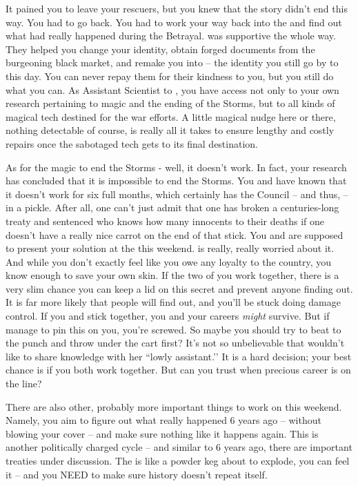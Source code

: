 \documentclass[char]{GL2020}
\begin{document}
It pained you to leave your rescuers, but you knew that the story didn’t end this way. You had to go back. You had to work your way back into the \pTech{} and find out what had really happened during the Betrayal. \cSavFlet{} was supportive the whole way. They helped you change your identity, obtain forged documents from the burgeoning black market, and remake you into \cAssistantScientist{} -- the identity you still go by to this day. You can never repay them for their kindness to you, but you still do what you can. As Assistant Scientist to \cHeadScientist{}, you have access not only to your own research pertaining to magic and the ending of the Storms, but to all kinds of magical tech destined for the war efforts. A little magical nudge here or there, nothing detectable of course, is really all it takes to ensure lengthy and costly repairs once the sabotaged tech gets to its final destination.

As for the magic to end the Storms - well, it doesn’t work. In fact, your research has concluded that it is impossible to end the Storms. You and \cHeadScientist{} have known that it doesn’t work for six full months, which certainly has the Council -- and thus, \cHeadScientist{} -- in a pickle.  After all, one can’t just admit that one has broken a centuries-long treaty and sentenced who knows how many innocents to their deaths if one doesn’t have a really nice carrot on the end of that stick. You and \cHeadScientist{} are supposed to present your solution at the \pSc{} this weekend. \cHeadScientist{} is really, really worried about it. And while you don’t exactly feel like you owe any loyalty to the country, you know enough to save your own skin. If the two of you work together, there is a very slim chance you can keep a lid on this secret and prevent anyone finding out. It is far more likely that people will find out, and you’ll be stuck doing damage control. If you and \cHeadScientist{} stick together, you and your careers \emph{might} survive. But if \cHeadScientist{\they} manage to pin this on you, you’re screwed. So maybe you should try to beat \cHeadScientist{\them} to the punch and throw \cHeadScientist{\them} under the cart first? It’s not so unbelievable that  \cHeadScientist{} wouldn’t like to share knowledge with her ``lowly assistant.’’ It is a hard decision; your best chance is if you both work together. But can you trust \cHeadScientist{} when \cHeadScientist{\their} precious career is on the line?

There are also other, probably more important things to work on this weekend. Namely, you aim to figure out what really happened 6 years ago -- without blowing your cover -- and make sure nothing like it happens again. This is another politically charged cycle -- and similar to 6 years ago, there are important treaties under discussion.  The \pSc{} is like a powder keg about to explode, you can feel it -- and you NEED to make sure history doesn’t repeat itself.
\end{document}
